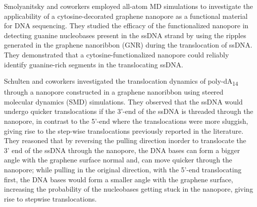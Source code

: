 Smolyanitsky and coworkers employed all-atom MD simulations to investigate the applicability of a cytosine-decorated graphene nanopore as a functional material for DNA sequencing.\supercite{paulechka_nucleobase-functionalized_2016} They studied the efficacy of the functionalized nanopore in detecting guanine nucleobases present in the ssDNA strand by using the ripples generated in the graphene nanoribbon (GNR) during the translocation of ssDNA. They demonstrated that a cytosine-functionalized nanopore could reliably identify guanine-rich segments in the translocating ssDNA.

Schulten and coworkers investigated the translocation dynamics of poly-dA\textsubscript{14} through a nanopore constructed in a graphene nanoribbon using steered molecular dynamics (SMD) simulations\supercite{qiu_intrinsic_2015}. They observed that the ssDNA would undergo quicker translocations if the 3'-end of the ssDNA is threaded through the nanopore, in contrast to the 5'-end where the translocations were more sluggish, giving rise to the step-wise translocations previously reported in the literature.  They reasoned that by reversing the pulling direction inorder to translocate the 3' end of the ssDNA through the nanopore, the DNA bases can form a bigger angle with the graphene surface normal and, can move quicker through the nanopore; while pulling in the original direction, with the 5'-end translocating first, the DNA bases would form a smaller angle with the graphene surface, increasing the probability of the nucleobases getting stuck in the nanopore, giving rise to stepwise translocations.

